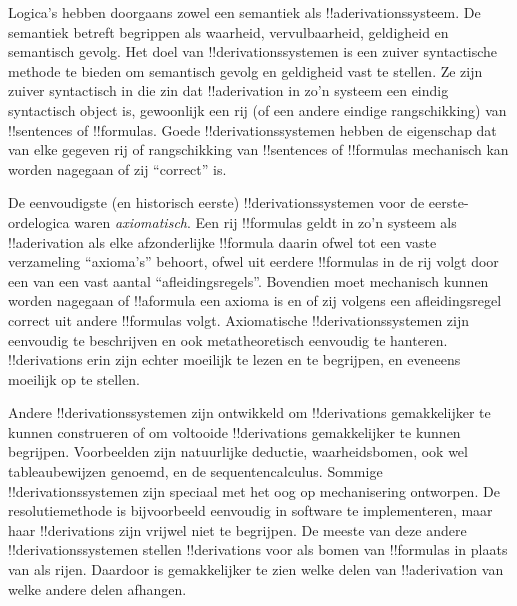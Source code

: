 \documentclass[../../../include/open-logic-section]{subfiles}
\begin{document}
      {}
      {}


Logica's hebben doorgaans zowel een semantiek als
!!a{derivation}ssysteem. De semantiek betreft begrippen als waarheid,
vervulbaarheid, geldigheid en semantisch gevolg. Het doel van
!!{derivation}ssystemen is een zuiver syntactische methode te bieden
om semantisch gevolg en geldigheid vast te stellen. Ze zijn zuiver
syntactisch in die zin dat !!a{derivation} in zo'n systeem een eindig
syntactisch object is, gewoonlijk een rij (of een andere eindige
rangschikking) van !!{sentence}s of !!{formula}s. Goede
!!{derivation}ssystemen hebben de eigenschap dat van elke gegeven rij
of rangschikking van !!{sentence}s of !!{formula}s mechanisch kan
worden nagegaan of zij ``correct'' is.

De eenvoudigste (en historisch eerste) !!{derivation}ssystemen voor
de eerste-ordelogica waren \emph{axiomatisch}. Een rij !!{formula}s
geldt in zo'n systeem als !!a{derivation} als elke afzonderlijke
!!{formula} daarin ofwel tot een vaste verzameling ``axioma's''
behoort, ofwel uit eerdere !!{formula}s in de rij volgt door een van
een vast aantal ``afleidingsregels''. Bovendien moet mechanisch kunnen
worden nagegaan of !!a{formula} een axioma is en of zij volgens een
afleidingsregel correct uit andere !!{formula}s volgt. Axiomatische
!!{derivation}ssystemen zijn eenvoudig te beschrijven en ook
metatheoretisch eenvoudig te hanteren. !!{derivation}s erin zijn echter
moeilijk te lezen en te begrijpen, en eveneens moeilijk op te stellen.

Andere !!{derivation}ssystemen zijn ontwikkeld om !!{derivation}s
gemakkelijker te kunnen construeren of om voltooide !!{derivation}s
gemakkelijker te kunnen begrijpen. Voorbeelden zijn natuurlijke
deductie, waarheidsbomen, ook wel tableaubewijzen genoemd, en de
sequentencalculus. Sommige !!{derivation}ssystemen zijn speciaal met
het oog op mechanisering ontworpen. De resolutiemethode is bijvoorbeeld
eenvoudig in software te implementeren, maar haar !!{derivation}s zijn
vrijwel niet te begrijpen. De meeste van deze andere
!!{derivation}ssystemen stellen !!{derivation}s voor als bomen van
!!{formula}s in plaats van als rijen. Daardoor is gemakkelijker te
zien welke delen van !!a{derivation} van welke andere delen afhangen.
\end{document}
